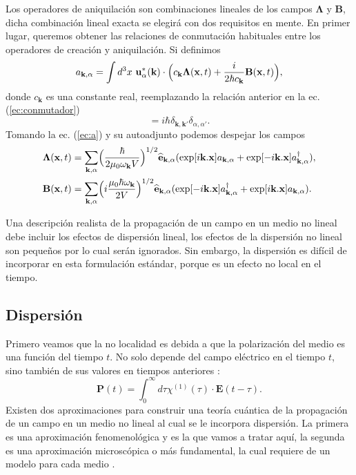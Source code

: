 Los operadores de aniquilación son combinaciones lineales de los campos $\mathbf{\Lambda}$ y $\textbf{B}$, dicha combinación lineal exacta se elegirá con dos requisitos en mente. En primer lugar, queremos obtener las relaciones de conmutación habituales entre los operadores de creación y aniquilación. Si definimos
\begin{equation}\label{ec:a}
a_{\textbf{k},\alpha}=\int d^3x \ \textbf{u}_{\alpha}^{*}(\textbf{k})\cdot \Bigl(c_{\textbf{k}}\mathbf{\Lambda}(\textbf{x},t)+\frac{i}{2\hbar c_{\textbf{k}}}\textbf{B}(\textbf{x},t)\Bigr),	
\end{equation}
donde $c_{\textbf{k}}$ es una constante real, reemplazando la relaci\'{o}n anterior en la ec. (\ref{ec:conmutador})
\begin{equation}
[a_{\textbf{k},\alpha},a_{\textbf{k}',\alpha'}^{\dagger}]=i\hbar \delta_{\textbf{k},\textbf{k}'}\delta_{\alpha,\alpha'}.
\end{equation}
Tomando la ec. (\ref{ec:a}) y su autoadjunto podemos despejar los campos
\begin{align}
\mathbf{\Lambda}(\textbf{x},t)&=\sum_{\textbf{k},\alpha}\Bigl(\frac{\hbar}{2\mu_0\omega_\textbf{k}V}\Bigr)^{1/2}\widehat{\textbf{e}}_{\textbf{k},\alpha}(\exp[i\textbf{k}.\textbf{x}]a_{\textbf{k},\alpha}+\exp[-i\textbf{k}.\textbf{x}]a_{\textbf{k},\alpha}^{\dagger}),\\
\textbf{B}(\textbf{x},t)&=\sum_{\textbf{k},\alpha}\Bigl(i\frac{\mu_0\hbar\omega_{\textbf{k}}}{2V}\Bigr)^{1/2}\widehat{\textbf{e}}_{\textbf{k},\alpha}(\exp[-i\textbf{k}.\textbf{x}]a_{\textbf{k},\alpha}^{\dagger}+\exp[i\textbf{k}.\textbf{x}]a_{\textbf{k},\alpha}).
\end{align}

Una descripción realista de la propagación de un campo en un medio no lineal debe incluir los efectos de dispersión lineal, los efectos de la dispersión no lineal son pequeños por lo cual ser\'{a}n ignorados. Sin embargo, la dispersión es difícil de incorporar en esta formulación estándar, porque es un efecto no local en el tiempo.
\subsection{Dispersi\'{o}n}
Primero veamos que la no localidad es  debida a que la polarización del medio es una funci\'{o}n del tiempo $t$. No solo depende del campo eléctrico en el tiempo $t$, sino también de sus valores en tiempos anteriores \citep{landau1960elektrodinamika}:
\begin{equation}\label{ec:dispersionlineal}
\textbf{P}(t)=\int_0^{\infty}d \tau \chi^{(1)}(\tau)\cdot\textbf{E}(t-\tau).
\end{equation}
Existen dos aproximaciones para construir una teor\'{i}a cu\'{a}ntica de la propagaci\'{o}n de un campo en un medio no lineal al cual se le incorpora dispersi\'{o}n. La primera es una aproximaci\'{o}n fenomenol\'{o}gica y es la que vamos a tratar aqu\'{i}, la segunda es una aproximaci\'{o}n microsc\'{o}pica o m\'{a}s fundamental, la cual requiere de un modelo para cada medio \cite{drummond2014quantum}.\\

